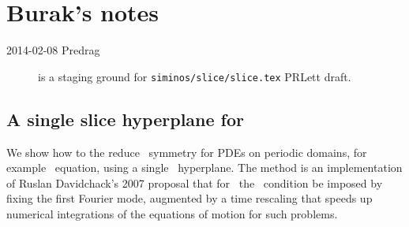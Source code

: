 
\chapter{Burak's notes}
\label{c-dailyBlogBB}

\renewcommand{\LieEl}{\ensuremath{g}}  %
\renewcommand{\gSpace}{\ensuremath{\theta}}   %
\renewcommand{\ssp}{x}
\renewcommand{\sspRed}{\ensuremath{\hat{x}}}  %
\renewcommand{\vel}{\ensuremath{v}}   %

\begin{description}

\item[2014-02-08  Predrag]  is a staging ground
for \texttt{siminos/slice/slice.tex}
 {PRLett draft}.

\end{description}

\section{A single slice hyperplane for }
\label{sect-SinglSlice}


We show how to the  reduce \ symmetry for PDEs on periodic
domains, for example \KS\ equation, using a single \slice\ hyperplane.
The method is an implementation of Ruslan Davidchack's 2007
proposal that for \KS\ the \slice\ condition be
imposed by fixing the first Fourier mode, augmented by a time rescaling
that speeds up numerical integrations of the equations of motion for such
problems.

